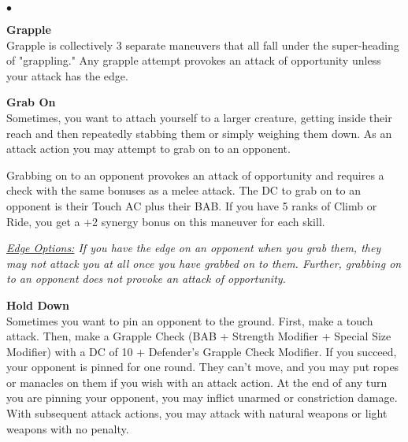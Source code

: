 \begin{list}{$\bullet$}{\itemspace}
\hypertarget{combat:grapple}{}
\normalsize\item\textbf{{Grapple}}\\\small
Grapple is collectively 3 separate maneuvers that all fall under the super-heading of "grappling." Any grapple attempt provokes an attack of opportunity unless your attack has the edge.

\listtwo\hypertarget{combat:grabon}{}
      \normalsize\item\textbf{{Grab On}}\\\small
      Sometimes, you want to attach yourself to a larger creature, getting inside their reach and then repeatedly stabbing them or simply weighing them down.  As an attack action you may attempt to grab on to an opponent.

      Grabbing on to an opponent provokes an attack of opportunity and requires a check with the same bonuses as a melee attack. The DC to grab on to an opponent is their Touch AC plus their BAB. If you have 5 ranks of Climb or Ride, you get a +2 synergy bonus on this maneuver for each skill.



      \smallskip\emph{\underline{Edge Options:} If you have the edge on an opponent when you grab them, they may not attack you at all once you have grabbed on to them. Further, grabbing on to an opponent does not provoke an attack of opportunity.}\\

     \hypertarget{combat:holddown}{}\hypertarget{combat:pin}{}
      \normalsize\item\textbf{{Hold Down}}\\\small
      Sometimes you want to pin an opponent to the ground. First, make a touch attack. Then, make a Grapple Check (BAB + Strength Modifier + Special Size Modifier) with a DC of 10 + Defender's Grapple Check Modifier. If you succeed, your opponent is pinned for one round. They can't move, and you may put ropes or manacles on them if you wish with an attack action. At the end of any turn you are pinning your opponent, you may inflict unarmed or constriction damage. With subsequent attack actions, you may attack with natural weapons or light weapons with no penalty.


\end{list}

